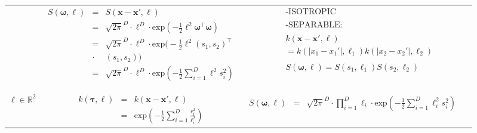 \documentclass[]{interact}
\theoremstyle{plain}%
\theoremstyle{definition}
\theoremstyle{remark}
\begin{document}
\begin{landscape}
\begin{table}[H]
\begin{center}
\begin{tabular}{|c|c|c|c|}
       & \multicolumn{1}{|p{8.2cm}|}{
         \begin{eqnarray*}
		S(\bm{\omega},\ell) &=& S(\bm{x}-\bm{x}',\ell)\\
		&=& \sqrt{2\pi}^D \cdot \ell^D \cdot \mathrm{exp}\left(-\frac{1}{2} \ell^2 \bm{\omega}^\top\bm{\omega} \right) \\
		&=& \sqrt{2\pi}^D \cdot \ell^D \cdot \mathrm{exp}\Big(-\frac{1}{2} \ell^2 (s_1, s_2)^\top\\
		&\cdot& (s_1, s_2) \Big) \\
		&=& \sqrt{2\pi}^D \cdot \ell^D \cdot \mathrm{exp}\left(-\frac{1}{2} \sum_{i=1}^{D}\ell^2 s_i^2 \right) \\
         \end{eqnarray*}
       }
       
       & \multicolumn{1}{|p{6.2cm}|}{
         \begin{eqnarray*}
        &&\text{-ISOTROPIC}\\
        \\
		&&\text{-SEPARABLE:} \\
		\\
		&&k(\bm{x}-\bm{x}',\bm{\ell})\\
		 &&= k(|x_1-x_1'|,\ell_1)k(|x_2-x_2'|,\ell_2)\\
		 \\
		&&S(\bm{\omega},\bm{\ell})= S(s_1,\ell_1)S(s_2,\ell_2)
         \end{eqnarray*}
       } \\
       \vspace{-15mm}\\
       \cline{1-3}
       
       \multicolumn{1}{|p{1.5cm}|}{
       \vspace{1mm}
       $\bm{\ell} \in \mathbb{R}^2$
       }
       
         & \multicolumn{1}{|p{7.2cm}|}{
         \begin{eqnarray*}
		k(\bm{\tau},\bm{\ell}) &=& k(\bm{x}-\bm{x}',\bm{\ell})\\
		&=& \mathrm{exp}\left(-\frac{1}{2} \sum_{i=1}^{D}\frac{r_i^2}{\ell_i^2} \right)
         \end{eqnarray*}
       }
       
       & \multicolumn{1}{|p{8.2cm}|}{
         \begin{eqnarray*}
		S(\bm{\omega},\ell) &=& \sqrt{2\pi}^D \cdot \prod_{i=1}^D \ell_i \cdot \mathrm{exp}\left(-\frac{1}{2} \sum_{i=1}^D \ell_i^2 s_i^2 \right)
         \end{eqnarray*}
       }
       

\end{tabular}
\end{center}
\end{table}
\end{landscape}
\end{document}
